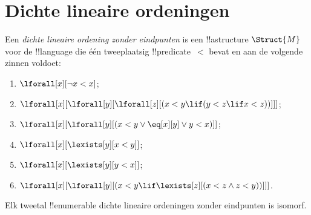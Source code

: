 \documentclass[../../../include/open-logic-section]{subfiles}
\begin{document}
\section{Dichte lineaire ordeningen}

\begin{defn}
  Een \emph{dichte lineaire ordening zonder eindpunten} is een !!a{structure}
  $\Struct{M}$ voor de !!{language} die één tweeplaatsig
  !!{predicate}~$<$ bevat en aan de volgende zinnen voldoet:
  \begin{enumerate}
  \item $\lforall[x][\lnot x < x]$;
  \item $\lforall[x][\lforall[y][\lforall[z][(x < y \lif (y < z \lif x
    <z ))]]]$;
  \item $\lforall[x][\lforall[y][(x< y \lor \eq[x][y] \lor y < x)]]$;
  \item $\lforall[x][\lexists[y][x < y]]$;
  \item $\lforall[x][\lexists[y][y < x]]$;
  \item $\lforall[x][\lforall[y][(x < y \lif \lexists[z][(x < z \land
        z < y))]]]$.
 \end{enumerate}
\end{defn}

\begin{thm}
  Elk tweetal !!{enumerable} dichte lineaire ordeningen zonder
  eindpunten is isomorf.
\end{thm}
\end{document}
